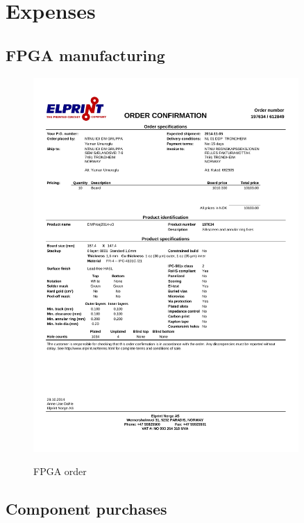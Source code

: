 \documentclass[../main/report.tex]{subfiles}
\begin{document}
\chapter{Expenses}

\section{FPGA manufacturing}

\begin{figure}[H]
    \centering
    \includegraphics[width=0.9\textwidth]{../appendix/assets/FPGA-purchase.pdf}
    \label{fig:fpga-order}
    \caption{FPGA order}
\end{figure}

\section{Component purchases}
\end{document}
